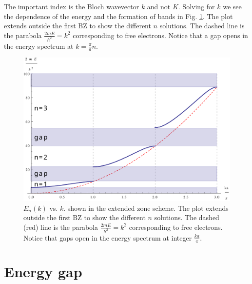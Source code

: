 \documentclass{Textbook}
\begin{document}
The important index is the Bloch wavevector $k$ and not $K$. Solving for $k$ we see the dependence of the energy and the formation of bands in Fig. \ref{fig:energy_bands}. The plot extends outside the first BZ to show the different $n$ solutions. The dashed line is the parabola $\frac{2mE}{\hbar^2}=k^2$ corresponding to free electrons. Notice that a gap opens in the energy spectrum at $k = \frac{\pi}{a}n$.
\begin{figure}[!ht] 
  \centering
  \includegraphics[width=15cm]{zones_ext.pdf}
  \caption{$E_n(k)$ vs. $k$. shown in the extended zone scheme. The plot extends outside the first BZ to show the different $n$ solutions. The dashed (red) line is the parabola $\frac{2mE}{\hbar^2}=k^2$ corresponding to free electrons. Notice that gaps open in the energy spectrum at integer $\frac{ka}{\pi}$.}
  \label{fig:energy_bands}
\end{figure}
\chapter{Energy gap}
\end{document}
